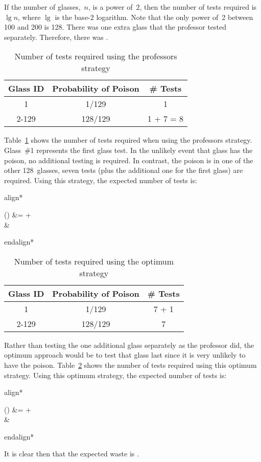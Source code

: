 \documentclass{report}
\newenvironment{aligncustom}
{ \csname align*\endcsname %
    \centering
}
{
  \csname endalign*\endcsname
}
\begin{document}
  If the number of glasses,~$n$, is a power of~$2$, then the number of tests required is $\lg n$, where $\lg$ is the base-$2$ logarithm.  Note that the only power of~2 between 100 and 200 is 128.  There was one extra glass that the professor tested separately.  Therefore, there was .
  
  \begin{table}[h]
    \centering
    \begin{tabular}{c|c|c}
      \hline
      Glass ID & Probability of Poison & \# Tests  \\\hline
      1        & 1/129                 & 1         \\\hline
      2-129    & 128/129               & 1 + 7 = 8 \\\hline
    \end{tabular}
    \caption{Number of tests required using the professors strategy}\label{tab:problem5.9.20-Prof}
  \end{table}
  
  Table~\ref{tab:problem5.9.20-Prof} shows the number of tests required when using the professors strategy.  Glass~\#1 represents the first glass test.  In the unlikely event that glass has the poison, no additional testing is required. In contrast, the poison is in one of the other 128~glasses, seven tests (plus the additional one for the first glass) are required.  Using this strategy, the expected number of tests is:
  
  \begin{aligncustom}
    () &=   +   \\
                                            &\approx {} 
  \end{aligncustom}
  
  \begin{table}[h]
    \centering
    \begin{tabular}{c|c|c}
      \hline
      Glass ID & Probability of Poison & \# Tests  \\\hline
      1        & 1/129                 & 7 + 1     \\\hline
      2-129    & 128/129               & 7         \\\hline
    \end{tabular}
    \caption{Number of tests required using the optimum strategy}\label{tab:problem5.9.20-Opt}
  \end{table}
  
  Rather than testing the one additional glass separately as the professor did, the optimum approach would be to test that glass last since it is very unlikely to have the poison.  Table~\ref{tab:problem5.9.20-Opt} shows the number of tests required using this optimum strategy.    Using this optimum strategy, the expected number of tests is:
 
  
  \begin{aligncustom}
    () &=   +   \\
    &\approx {} 
  \end{aligncustom}
  
  It is clear then that the expected waste is .
  
\end{document}
